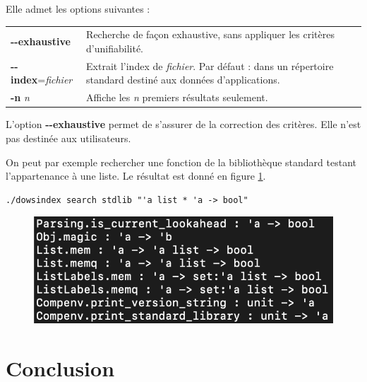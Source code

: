 \documentclass[a4paper]{report}
\theoremstyle{definition}
\begin{document}
{Elle admet les options suivantes :

\begin{table}[h]
  \begin{tabularx}{\textwidth}{lX}
      \textbf{-{}-exhaustive} &
      Recherche de façon exhaustive, sans appliquer les critères d'unifiabilité.
    \\
      \textbf{-{}-index}=\textit{fichier} &
      Extrait l'index de \textit{fichier}. Par défaut : dans un répertoire standard destiné aux données d'applications.
    \\
      \textbf{-n} \textit{n} &
      Affiche les \textit{n} premiers résultats seulement.
  \end{tabularx}
\end{table}

L'option \textbf{-{}-exhaustive} permet de s'assurer de la correction des critères. Elle n'est pas destinée aux utilisateurs.

On peut par exemple rechercher une fonction de la bibliothèque standard testant l'appartenance à une liste. Le résultat est donné en figure \ref{fig_dowsindex_search}.

\begin{verbatim}
./dowsindex search stdlib "'a list * 'a -> bool"
\end{verbatim}

\begin{figure}[h]
  \begin{center}
    \includegraphics[scale=0.25]{images/dowsindex-search}
  \end{center}
  \caption{\label{fig_dowsindex_search}}
\end{figure}


\chapter{Conclusion}

}
\end{document}
